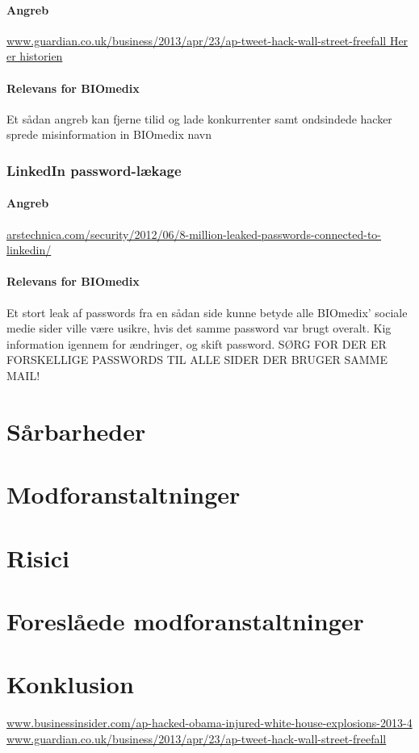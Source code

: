 \documentclass{article}
\begin{document}
\paragraph{Angreb}
\url{www.guardian.co.uk/business/2013/apr/23/ap-tweet-hack-wall-street-freefall Her er historien}
\paragraph{Relevans for BIOmedix}

Et sådan angreb kan fjerne tilid og lade konkurrenter samt ondsindede hacker sprede misinformation in BIOmedix navn 
\newpage
\subsubsection{LinkedIn password-lækage}

\paragraph{Angreb}
\url{arstechnica.com/security/2012/06/8-million-leaked-passwords-connected-to-linkedin/}
\paragraph{Relevans for BIOmedix}

Et stort leak af passwords fra en sådan side kunne betyde alle BIOmedix' sociale medie sider ville være usikre, hvis det samme password var brugt overalt. Kig information igennem for ændringer, og skift password. SØRG FOR DER ER FORSKELLIGE PASSWORDS TIL ALLE SIDER DER BRUGER SAMME MAIL! 

\section{Sårbarheder}

\section{Modforanstaltninger}

\section{Risici}

\section{Foreslåede modforanstaltninger}

\section{Konklusion}
\newpage
\begin{thebibliography}{100}


\url{www.businessinsider.com/ap-hacked-obama-injured-white-house-explosions-2013-4}
\url{www.guardian.co.uk/business/2013/apr/23/ap-tweet-hack-wall-street-freefall}
\end{thebibliography}
\end{document}
